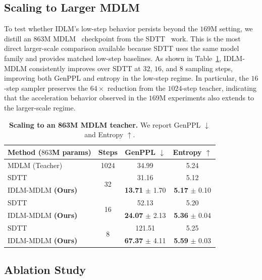 \subsection{Scaling to Larger MDLM}
\label{app:mdlm-scaling}
To test whether IDLM's low-step behavior persists beyond the $169$M setting, we distill an $863$M MDLM~\citep{sahoo2024simple} checkpoint from the SDTT~\citep{deschenaux2024beyond} work. This is the most direct larger-scale comparison available because SDTT uses the same model family and provides matched low-step baselines. As shown in Table~\ref{tab:mdlm-scaling}, IDLM-MDLM consistently improves over SDTT at $32$, $16$, and $8$ sampling steps, improving both GenPPL and entropy in the low-step regime. In particular, the $16$-step sampler preserves the $64\times$ reduction from the $1024$-step teacher, indicating that the acceleration behavior observed in the $169$M experiments also extends to the larger-scale regime.

\begin{table}[t]
\centering
\caption{\textbf{Scaling to an 863M MDLM teacher.} We report GenPPL $\downarrow$ and Entropy $\uparrow$.}
\label{tab:mdlm-scaling}
\footnotesize
\begin{tabular}{lccc}
\toprule
Method ($863$M params) & Steps & GenPPL $\downarrow$ & Entropy $\uparrow$ \\
\midrule
MDLM (Teacher)~\citep{sahoo2024simple} & 1024 & 34.99 & 5.24 \\
\midrule
SDTT~\citep{deschenaux2024beyond} & \multirow{2}{*}{32} & 31.16 & 5.12 \\
IDLM-MDLM \textbf{(Ours)} & & \textbf{13.71} $\pm$ 1.70 & \textbf{5.17} $\pm$ 0.10 \\
\midrule
SDTT~\citep{deschenaux2024beyond} & \multirow{2}{*}{16} & 52.13 & 5.20 \\
IDLM-MDLM \textbf{(Ours)} & & \textbf{24.07} $\pm$ 2.13 & \textbf{5.36} $\pm$ 0.04 \\
\midrule
SDTT~\citep{deschenaux2024beyond} & \multirow{2}{*}{8} & 121.51 & 5.25 \\
IDLM-MDLM \textbf{(Ours)} & & \textbf{67.37} $\pm$ 4.11 & \textbf{5.59} $\pm$ 0.03 \\
\bottomrule
\end{tabular}
\end{table}

\clearpage
\subsection{Ablation Study}
\label{app:ablation-results}

